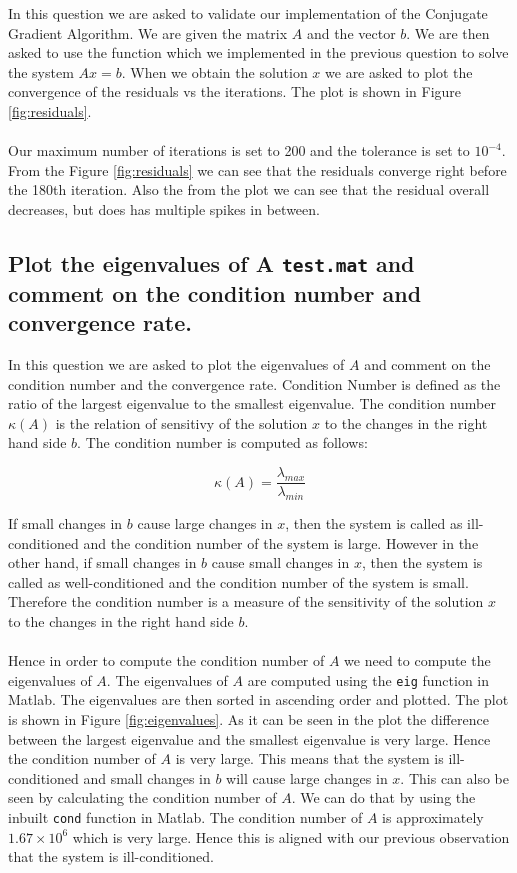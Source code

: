 \documentclass[unicode,11pt,a4paper,oneside,numbers=endperiod,openany]{scrartcl}
\begin{document}
In this question we are asked to validate our implementation of the Conjugate Gradient Algorithm. We are given the matrix $A$ and the vector $b$. We are then asked to use the function which we implemented in the previous question to solve the system $Ax = b$. When we obtain the solution $x$ we are asked to plot the convergence of the residuals vs the iterations. The plot is shown in Figure \ref{fig:residuals}.
\\
\\
Our maximum number of iterations is set to 200 and the tolerance is set to $10^{-4}$. From the Figure \ref{fig:residuals} we can see that the residuals converge right before the 180th iteration. Also the from the plot we can see that the residual overall decreases, but does has multiple spikes in between.

\subsection{Plot the eigenvalues of A \texttt{test.mat} and comment on the condition number and convergence rate.}

In this question we are asked to plot the eigenvalues of $A$ and comment on the condition number and the convergence rate. Condition Number is defined as the ratio of the largest eigenvalue to the smallest eigenvalue. The condition number $\kappa(A)$ is the relation of sensitivy of the solution $x$ to the changes in the right hand side $b$. The condition number is computed as follows:

\begin{equation}
    \kappa(A) = \frac{\lambda_{max}}{\lambda_{min}}
\end{equation}

If small changes in $b$ cause large changes in $x$, then the system is called as ill-conditioned and the condition number of the system is large. However in the other hand, if small changes in $b$ cause small changes in $x$, then the system is called as well-conditioned and the condition number of the system is small. Therefore the condition number is a measure of the sensitivity of the solution $x$ to the changes in the right hand side $b$.
\\
\\
Hence in order to compute the condition number of $A$ we need to compute the eigenvalues of $A$. The eigenvalues of $A$ are computed using the \texttt{eig} function in Matlab. The eigenvalues are then sorted in ascending order and plotted. The plot is shown in Figure \ref{fig:eigenvalues}. As it can be seen in the plot the difference between the largest eigenvalue and the smallest eigenvalue is very large. Hence the condition number of $A$ is very large. This means that the system is ill-conditioned and small changes in $b$ will cause large changes in $x$. This can also be seen by calculating the condition number of $A$. We can do that by using the inbuilt \texttt{cond} function in Matlab. The condition number of $A$ is approximately $1.67 \times 10^{6}$ which is very large. Hence this is aligned with our previous observation that the system is ill-conditioned.
\end{document}
